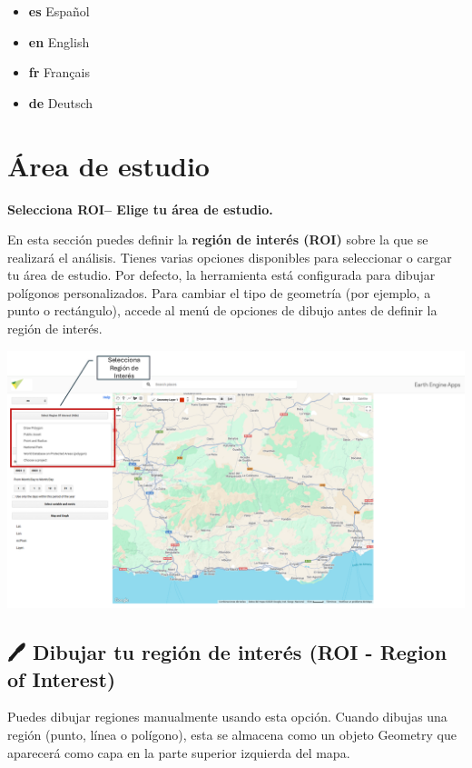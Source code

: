 \documentclass[
]{book}
\begin{document}
\begin{itemize}
\item
  \textbf{es}
  Español
\item
  \textbf{en}
  English
\item
  \textbf{fr}
  Français
\item
  \textbf{de}
  Deutsch
\end{itemize}

\chapter{Área de estudio}\label{area-estudio}

\textbf{Selecciona ROI-- Elige tu área de estudio.}

En esta sección puedes definir la \textbf{región de interés (ROI)} sobre la que se realizará el análisis. Tienes varias opciones disponibles para seleccionar o cargar tu área de estudio. Por defecto, la herramienta está configurada para dibujar polígonos personalizados. Para cambiar el tipo de geometría (por ejemplo, a punto o rectángulo), accede al menú de opciones de dibujo antes de definir la región de interés.

\includegraphics{assets/ROI_es.png}

\section{\texorpdfstring{\textbf{🖊️ Dibujar tu región de interés (ROI - Region of Interest)}}{🖊️ Dibujar tu región de interés (ROI - Region of Interest)}}\label{dibujar-tu-regiuxf3n-de-interuxe9s-roi---region-of-interest}

Puedes dibujar regiones manualmente usando esta opción. Cuando dibujas una región (punto, línea o polígono), esta se almacena como un objeto Geometry que aparecerá como capa en la parte superior izquierda del mapa.
\end{document}
